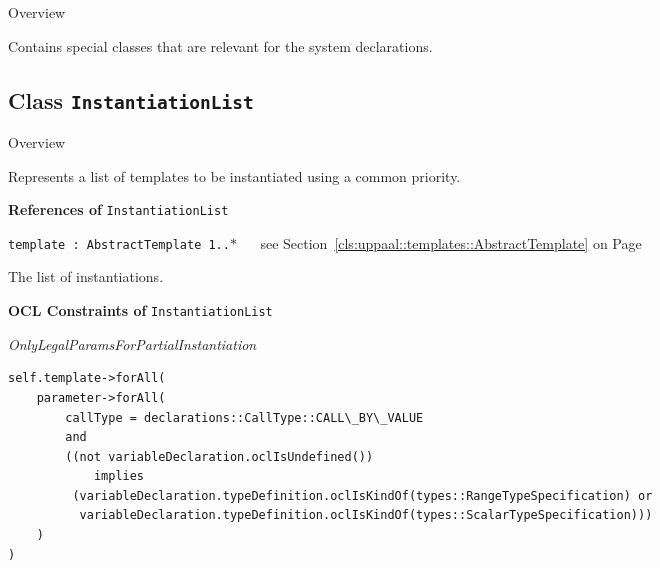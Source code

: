 		\begin{longdescription}
		\item[Overview]			
				

	

		Contains special classes that are relevant for the system declarations.		
		\end{longdescription}
	

\subsection{Class \bfseries \texttt{InstantiationList}\normalfont}
\label{cls:uppaal::declarations::system::InstantiationList} 
	
	\begin{longdescription}
		\item[Overview] 		
				

	

		Represents a list of templates to be instantiated using a common priority.		
		
	
			\item[\textbf{References of} \texttt{InstantiationList}] ~
			\begin{longdescription}
	\item[\texttt{template : AbstractTemplate 	\symbol{"5B}1..$*$\symbol{"5D}
}] ~
	see Section~\ref{cls:uppaal::templates::AbstractTemplate} on Page~\pageref{cls:uppaal::templates::AbstractTemplate}
	
	\nopagebreak
		
				

	

		The list of instantiations.		
			\end{longdescription}
			\item[\textbf{OCL Constraints of} \texttt{InstantiationList}] ~
			\begin{longdescription}
	\item[\small\textit{OnlyLegalParamsForPartialInstantiation}] ~ 
	\nopagebreak
	
		\begin{lstlisting}[breaklines=true]
self.template->forAll(
	parameter->forAll(
		callType = declarations::CallType::CALL\_BY\_VALUE
		and
		((not variableDeclaration.oclIsUndefined())
			implies
		 (variableDeclaration.typeDefinition.oclIsKindOf(types::RangeTypeSpecification) or
		  variableDeclaration.typeDefinition.oclIsKindOf(types::ScalarTypeSpecification)))
	)
)		\end{lstlisting}
			\end{longdescription}
	
	\end{longdescription}
	

